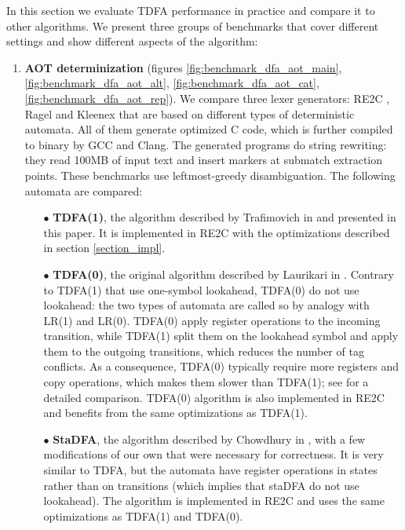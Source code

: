 \documentclass[]{article}
\begin{document}
In this section we evaluate TDFA performance in practice and compare it to other algorithms.
We present three groups of benchmarks that cover different settings and show different aspects of the algorithm:
\medskip

\begin{enumerate}%

\item
\textbf{AOT determinization}
(figures \ref{fig:benchmark_dfa_aot_main}, \ref{fig:benchmark_dfa_aot_alt}, \ref{fig:benchmark_dfa_aot_cat}, \ref{fig:benchmark_dfa_aot_rep}).
We compare three lexer generators: RE2C \cite{RE2C}, Ragel \cite{Ragel} and Kleenex \cite{Kleenex}
that are based on different types of deterministic automata.
All of them generate optimized C code, which is further compiled to binary by GCC and Clang.
The generated programs do string rewriting: they read 100MB of input text and insert markers at submatch extraction points.
These benchmarks use leftmost-greedy disambiguation.
The following automata are compared:
\medskip

\begin{itemize}

\item[$\bullet$]
\textbf{TDFA(1)}, the algorithm described by Trafimovich in \cite{Tro17} and presented in this paper.
It is implemented in RE2C with the optimizations described in section \ref{section_impl}.
\medskip

\item[$\bullet$]
\textbf{TDFA(0)}, the original algorithm described by Laurikari in \cite{Lau00}.
Contrary to TDFA(1) that use one-symbol lookahead, TDFA(0) do not use lookahead:
the two types of automata are called so by analogy with LR(1) and LR(0).
TDFA(0) apply register operations to the incoming transition,
while TDFA(1) split them on the lookahead symbol and apply them to the outgoing transitions, which reduces the number of tag conflicts.
As a consequence, TDFA(0) typically require more registers and copy operations, which makes them slower than TDFA(1);
see \cite{Tro17} for a detailed comparison.
TDFA(0) algorithm is also implemented in RE2C and benefits from the same optimizations as TDFA(1).
\medskip

\item[$\bullet$]
\textbf{StaDFA}, the algorithm described by Chowdhury in \cite{Cho18},
with a few modifications of our own that were necessary for correctness.
It is very similar to TDFA, but the automata have register operations in states rather than on transitions
(which implies that staDFA do not use lookahead).
The algorithm is implemented in RE2C and uses the same optimizations as TDFA(1) and TDFA(0).
\medskip


\end{itemize}
\end{enumerate}
\end{document}
